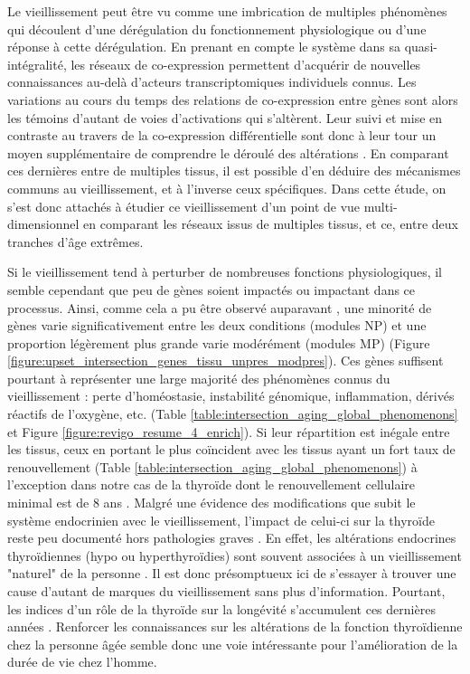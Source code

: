 Le vieillissement peut être vu comme une imbrication de multiples phénomènes qui découlent d'une dérégulation du fonctionnement physiologique ou d'une réponse à cette dérégulation. En prenant en compte le système dans sa quasi-intégralité, les réseaux de co-expression permettent d'acquérir de nouvelles connaissances au-delà d'acteurs transcriptomiques individuels connus. Les variations au cours du temps des relations de co-expression entre gènes sont alors les témoins d'autant de voies d'activations qui s'altèrent. Leur suivi et mise en contraste au travers de la co-expression différentielle sont donc à leur tour un moyen supplémentaire de comprendre le déroulé des altérations . En comparant ces dernières entre de multiples tissus, il est possible d'en déduire des mécanismes communs au vieillissement, et à l'inverse ceux spécifiques. Dans cette étude, on s'est donc attachés à étudier ce vieillissement d'un point de vue multi-dimensionnel en comparant les réseaux issus de multiples tissus, et ce, entre deux tranches d'âge extrêmes. 

Si le vieillissement tend à perturber de nombreuses fonctions physiologiques, il semble cependant que peu de gènes soient impactés ou impactant dans ce processus. Ainsi, comme cela a pu être observé auparavant , une minorité de gènes varie significativement entre les deux conditions (modules NP) et une proportion légèrement plus grande varie modérément (modules MP) (Figure \ref{figure:upset_intersection_genes_tissu_unpres_modpres}). Ces gènes suffisent pourtant à représenter une large majorité des phénomènes connus du vieillissement : perte d'homéostasie, instabilité génomique, inflammation, dérivés réactifs de l'oxygène, etc. (Table \ref{table:intersection_aging_global_phenomenons} et Figure \ref{figure:revigo_resume_4_enrich}). Si leur répartition est inégale entre les tissus, ceux en portant le plus coïncident avec les tissus ayant un fort taux de renouvellement  (Table \ref{table:intersection_aging_global_phenomenons}) à l'exception dans notre cas de la thyroïde dont le renouvellement cellulaire minimal est de 8 ans . Malgré une évidence des modifications que subit le système endocrinien avec le vieillissement, l'impact de celui-ci sur la thyroïde reste peu documenté hors pathologies graves . En effet, les altérations endocrines thyroïdiennes (hypo ou hyperthyroïdies) sont souvent associées à un vieillissement "naturel" de la personne . Il est donc présomptueux ici de s'essayer à trouver une cause d'autant de marques du vieillissement sans plus d'information. Pourtant, les indices d'un rôle de la thyroïde sur la longévité s'accumulent ces dernières années . Renforcer les connaissances sur les altérations de la fonction thyroïdienne chez la personne âgée semble donc une voie intéressante pour l'amélioration de la durée de vie chez l'homme.


